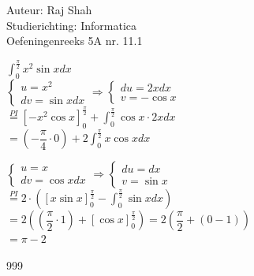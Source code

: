 \documentclass[a4paper]{article}
\begin{document}
  
\noindent \large Auteur: Raj Shah \\
\noindent \large Studierichting: Informatica\\
\noindent \large Oefeningenreeks 5A nr. 11.1 \\

\medskip

\normalsize

$\displaystyle\int_{0}^{\tfrac{\pi}{2}} x^2 \sin x dx $\\

$\left\{
    \begin{array}{l}
        u = x^2 \\
        dv = \sin x dx
    \end{array}
\right.
\Rightarrow
\left\{
    \begin{array}{l}
        du =  2x dx \\
        v = - \cos x
    \end{array}
\right.$\\

$ \overset{PI}{=} [-x^2 \cos x]_{0}^{\tfrac{\pi}{2}} + \displaystyle\int_{0}^{\tfrac{\pi}{2}} \cos x \cdot 2x dx$\\

$ = \left(-\dfrac{\pi}{4} \cdot 0\right)+ 2\displaystyle\int_{0}^{\tfrac{\pi}{2}} x \cos x dx$

$\left\{
    \begin{array}{l}
        u = x \\
        dv = \cos x dx
    \end{array}
\right.
\Rightarrow
\left\{
    \begin{array}{l}
        du =  dx \\
        v = \sin x
    \end{array}
\right.$\\

$ \overset{PI}{=} 2\cdot \left([x \sin x]_{0}^{\tfrac{\pi}{2}} - \displaystyle\int_{0}^{\tfrac{\pi}{2}}\sin x dx\right) $\\

$ = 2\left(\left(\dfrac{\pi}{2} \cdot 1\right) + [\cos x]_0^{\tfrac{\pi}{2}}\right) = 2\left(\dfrac{\pi}{2} + (0-1)\right)$\\

$ = \pi - 2$\\

\begin{thebibliography}{999}
\end{thebibliography}
\end{document}
